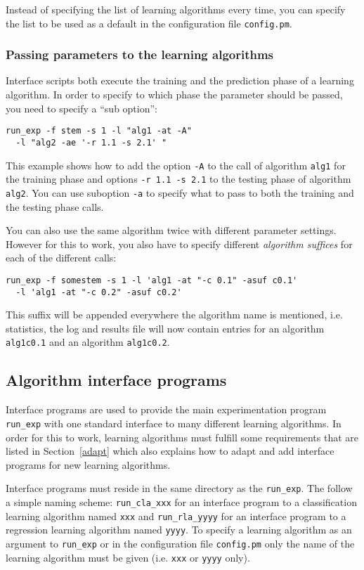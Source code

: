 \documentclass[a4paper,10pt,twoside]{article}
\begin{document}
Instead of specifying the list of learning algorithms every time,
you can specify the list to be used as a default in the 
configuration file \texttt{config.pm}.

\subsubsection{Passing parameters to the learning algorithms}

Interface scripts both execute the training and the 
prediction phase of a learning algorithm. In order to
specify to which phase the parameter should be passed, you 
need to specify a ``sub option'':
\begin{verbatim}
run_exp -f stem -s 1 -l "alg1 -at -A" 
  -l "alg2 -ae '-r 1.1 -s 2.1' " 
\end{verbatim}
This example shows how to add the option \texttt{-A} to the call
of algorithm \texttt{alg1} for the training phase and options
\texttt{-r 1.1 -s 2.1} to the testing phase of algorithm \texttt{alg2}.
You can use suboption \texttt{-a} to specify what to pass to 
both the training and the testing phase calls.

You can also use the same algorithm twice with different 
parameter settings. However for this to work, you also have to
specify different \emph{algorithm suffices} for each of the
different calls:
\begin{verbatim}
run_exp -f somestem -s 1 -l 'alg1 -at "-c 0.1" -asuf c0.1' 
  -l 'alg1 -at "-c 0.2" -asuf c0.2'
\end{verbatim}
This suffix will be appended everywhere the algorithm name is mentioned, i.e.
statistics, the log and results file will now contain entries for
an algorithm \texttt{alg1c0.1} and an algorithm \texttt{alg1c0.2}.

\subsection{Algorithm interface programs}
\label{interface}

Interface programs are used to provide the main experimentation
program \verb=run_exp= with one standard interface to many different
learning algorithms. In order for this to work, learning algorithms
must fulfill some requirements that are listed in Section~\ref{adapt}
which also explains how to adapt and add interface programs for 
new learning algorithms.

Interface programs must reside in the same directory as the \verb=run_exp=.
The follow a simple naming scheme: \verb=run_cla_xxx= for an interface
program to a classification learning algorithm named \verb=xxx= and
\verb=run_rla_yyyy= for an interface program to a regression learning
algorithm named \verb=yyyy=. To specify a learning algorithm as an 
argument to \verb=run_exp= or in the configuration file \verb=config.pm=
only the name of the learning algorithm must be given (i.e. \verb=xxx= or
\verb=yyyy= only).
\end{document}
